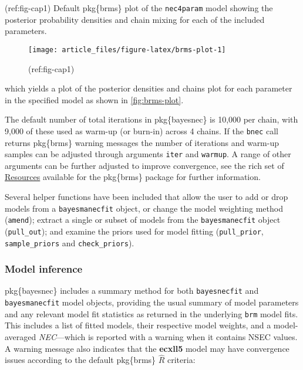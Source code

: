 \documentclass[
]{jss}
\begin{document}
(ref:fig-cap1) Default pkg\{brms\} plot of the \texttt{nec4param} model
showing the posterior probability densities and chain mixing for each of
the included parameters.

\begin{CodeChunk}
\begin{figure}

{\centering \texttt{[image: article\_files/figure-latex/brms-plot-1]} 

}

\caption[(ref:fig-cap1)]{(ref:fig-cap1)}\label{fig:brms-plot}
\end{figure}
\end{CodeChunk}

which yields a plot of the posterior densities and chains plot for each
parameter in the specified model as shown in \autoref{fig:brms-plot}.

The default number of total iterations in pkg\{bayesnec\} is 10,000 per
chain, with 9,000 of these used as warm-up (or burn-in) across 4 chains.
If the \texttt{bnec} call returns pkg\{brms\} warning messages the
number of iterations and warm-up samples can be adjusted through
arguments \texttt{iter} and \texttt{warmup}. A range of other arguments
can be further adjusted to improve convergence, see the rich set of
\href{https://github.com/paul-buerkner/brms}{Resources} available for
the pkg\{brms\} package for further information.

Several helper functions have been included that allow the user to add
or drop models from a \texttt{bayesmanecfit} object, or change the model
weighting method (\texttt{amend}); extract a single or subset of models
from the \texttt{bayesmanecfit} object (\texttt{pull\_out}); and examine
the priors used for model fitting (\texttt{pull\_prior},
\texttt{sample\_priors} and \texttt{check\_priors}).

\hypertarget{model-inference}{%
\subsubsection{Model inference}\label{model-inference}}

pkg\{bayesnec\} includes a summary method for both \texttt{bayesnecfit}
and \texttt{bayesmanecfit} model objects, providing the usual summary of
model parameters and any relevant model fit statistics as returned in
the underlying \texttt{brm} model fits. This includes a list of fitted
models, their respective model weights, and a model-averaged
\emph{NEC}---which is reported with a warning when it contains NSEC
values. A warning message also indicates that the \textbf{ecxll5} model
may have convergence issues according to the default pkg\{brms\}
\(\widehat{R}\) criteria:
\end{document}
